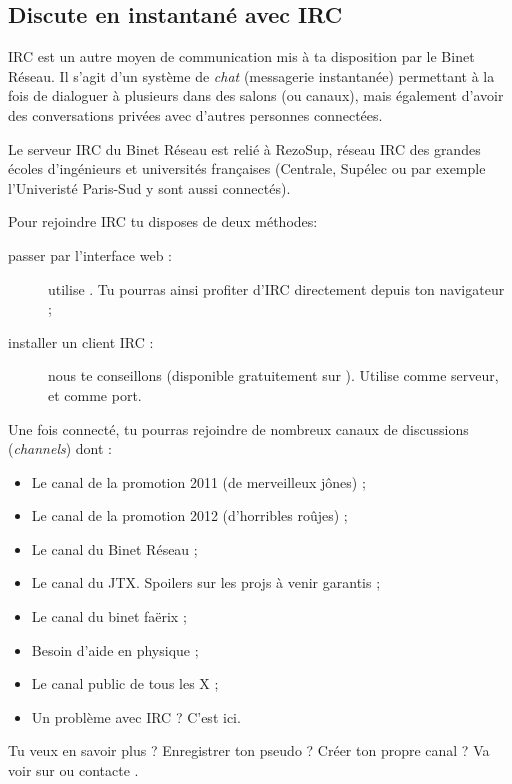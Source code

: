 %
\subsection{Discute en instantan\'e avec IRC}

\label{irc}

IRC est un autre moyen de communication mis \`a ta disposition par le Binet R\'eseau.
Il s'agit d'un syst\`eme de \emph{chat} (messagerie instantan\'ee) permettant \`a la fois de dialoguer \`a plusieurs dans des salons (ou canaux),
mais \'egalement d'avoir des conversations priv\'ees avec d'autres personnes connect\'ees.


Le serveur IRC du Binet R\'eseau est reli\'e \`a RezoSup, r\'eseau IRC des grandes \'ecoles d'ing\'enieurs et universit\'es françaises (Centrale, Sup\'elec ou par exemple l'Univerist\'e Paris-Sud y sont aussi connect\'es).

Pour rejoindre IRC tu disposes de deux m\'ethodes:

                  
\begin{description}
  \item[passer par l'interface web :] utilise . Tu pourras ainsi profiter d'IRC directement depuis ton navigateur ;
  \item[installer un client IRC :] nous te conseillons  (disponible gratuitement sur \linebreak {}). Utilise   comme serveur, et  comme port.
\end{description}

 
Une fois connect\'e, tu pourras rejoindre de nombreux canaux de discussions (\emph{channels}) dont :
\begin{itemize}
  \item {} Le canal de la promotion 2011 (de merveilleux j\^ones) ;
   \item {} Le canal de la promotion 2012 (d'horribles ro\^ujes) ;
  \item {} Le canal du Binet R\'eseau ;
  \item {} Le canal du JTX. Spoilers sur les projs \`a venir garantis ;
  \item {} Le canal du binet fa\"erix ;
  \item {} Besoin d'aide en physique ;
  \item {} Le canal public de tous les X ;
  \item {} Un probl\`eme avec IRC ? C'est ici.
\end{itemize}

 Tu veux en savoir plus ? Enregistrer ton pseudo ? Cr\'eer ton propre canal ? Va voir sur  ou contacte .


